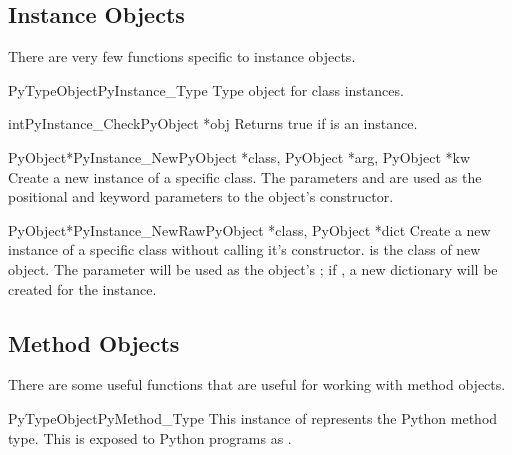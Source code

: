 \subsection{Instance Objects \label{instanceObjects}}

There are very few functions specific to instance objects.

\begin{cvardesc}{PyTypeObject}{PyInstance_Type}
  Type object for class instances.
\end{cvardesc}

\begin{cfuncdesc}{int}{PyInstance_Check}{PyObject *obj}
  Returns true if  is an instance.
\end{cfuncdesc}

\begin{cfuncdesc}{PyObject*}{PyInstance_New}{PyObject *class,
                                             PyObject *arg,
                                             PyObject *kw}
  Create a new instance of a specific class.  The parameters 
  and  are used as the positional and keyword parameters to
  the object's constructor.
\end{cfuncdesc}

\begin{cfuncdesc}{PyObject*}{PyInstance_NewRaw}{PyObject *class,
                                                PyObject *dict}
  Create a new instance of a specific class without calling it's
  constructor.   is the class of new object.  The
   parameter will be used as the object's ;
  if \NULL{}, a new dictionary will be created for the instance.
\end{cfuncdesc}


\subsection{Method Objects \label{method-objects}}

There are some useful functions that are useful for working with
method objects.

\begin{cvardesc}{PyTypeObject}{PyMethod_Type}
  This instance of  represents the Python method
  type.  This is exposed to Python programs as .
\end{cvardesc}

